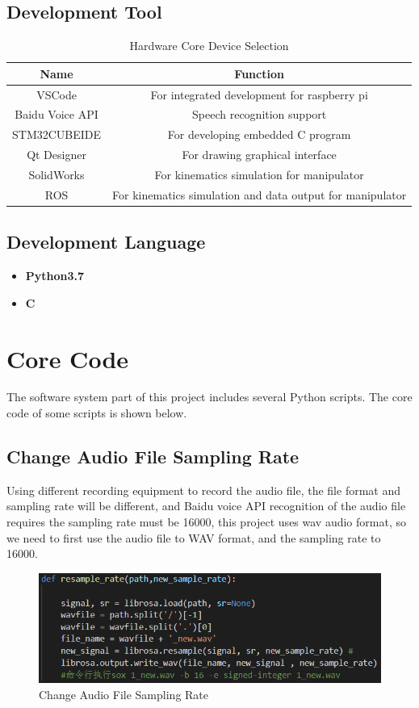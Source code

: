 \documentclass{hci}
\begin{document}
\subsection{Development Tool}
\begin{table}[htbp] %
	\caption{Hardware Core Device Selection} %
	\centering
	\label{DS}
	\begin{tabular}{c|c} %
		\hline
		\hline
		Name& Function                                                                                                                                         \\
		\hline VSCode& For integrated development for raspberry pi
		\\
		\hline Baidu Voice API&Speech recognition support
		\\
		\hline	STM32CUBEIDE&For developing embedded C program
		\\
		\hline Qt Designer&For drawing graphical interface\\
		\hline SolidWorks&For kinematics simulation for manipulator\\
		\hline ROS&For kinematics simulation and data output for manipulator\\
		\hline
	\end{tabular}
\end{table}
\subsection{Development Language}
\begin{itemize}
	\item \textbf{Python3.7}
	\item \textbf{C}	
\end{itemize}

\section{Core Code}
The software system part of this project includes several Python scripts. The core code of some scripts is shown below.
\subsection{Change Audio File Sampling Rate}
Using different recording equipment to record the audio file, the file format and sampling rate will be different, and Baidu voice API recognition of the audio file requires the sampling rate must be 16000, this project uses wav audio format, so we need to first use the audio file to WAV format, and the sampling rate to 16000.
\begin{figure}[htbp]
	\centering
	\includegraphics[width=0.9\linewidth]{figures/71}
	\caption{Change Audio File Sampling Rate}
	\label{fig:61}
\end{figure}
\end{document}
